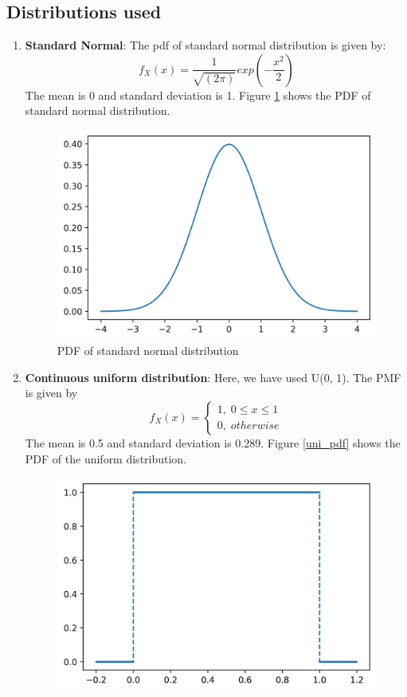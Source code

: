 \documentclass{article}
\begin{document}
\subsection{Distributions used}
\begin{enumerate}
    \item \textbf{Standard Normal}: The pdf of standard normal distribution is given by:
    $$f_X(x) = \dfrac{1}{\sqrt{(2\pi)}}exp(-\dfrac{x^2}{2})$$
    The mean is 0 and standard deviation is 1. Figure \ref{normal_pdf} shows the PDF of standard normal distribution.
    \begin{figure}[H]
        \centering
        \includegraphics[scale=0.5]{images/gaussian.png}
        \caption{PDF of standard normal distribution}
        \label{normal_pdf}
    \end{figure}
    \item \textbf{Continuous uniform distribution}: Here, we have used U(0, 1). The PMF is given by $$f_X(x) = \begin{cases}1,\; 0 \le x \le 1 \\ 0,\; otherwise\end{cases}$$ 
    The mean is 0.5 and standard deviation is 0.289. Figure \ref{uni_pdf} shows the PDF of the uniform distribution.
    \begin{figure}[H]
        \centering
        \includegraphics[scale=0.5]{images/uniform.png}

\end{figure}
\end{enumerate}
\end{document}
